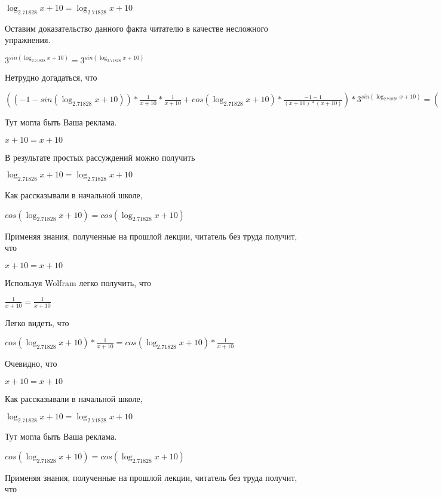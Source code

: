 \documentclass[12pt,a4paper,fleqn]{article}
\theoremstyle{definition}
\begin{document}
$\log_{ 2.71828 }{ x  +  10 } = \log_{ 2.71828 }{ x  +  10 }$

Оставим доказательство данного факта читателю в качестве несложного упражнения. 

${ 3 }^{sin(\log_{ 2.71828 }{ x  +  10 })} = { 3 }^{sin(\log_{ 2.71828 }{ x  +  10 })}$

Нетрудно догадаться, что 

$(( -1  - sin(\log_{ 2.71828 }{ x  +  10 })) * \frac{ 1 }{ x  +  10 }
 * \frac{ 1 }{ x  +  10 }
 + cos(\log_{ 2.71828 }{ x  +  10 }) * \frac{ -1  -  1 }{( x  +  10 ) * ( x  +  10 )}
) * { 3 }^{sin(\log_{ 2.71828 }{ x  +  10 })} = (( -1  - sin(\log_{ 2.71828 }{ x  +  10 })) * \frac{ 1 }{ x  +  10 }
 * \frac{ 1 }{ x  +  10 }
 + cos(\log_{ 2.71828 }{ x  +  10 }) * \frac{ -1  -  1 }{( x  +  10 ) * ( x  +  10 )}
) * { 3 }^{sin(\log_{ 2.71828 }{ x  +  10 })}$

Тут могла быть Ваша реклама. 

$ x  +  10  =  x  +  10 $

В результате простых рассуждений можно получить 

$\log_{ 2.71828 }{ x  +  10 } = \log_{ 2.71828 }{ x  +  10 }$

Как рассказывали в начальной школе, 

$cos(\log_{ 2.71828 }{ x  +  10 }) = cos(\log_{ 2.71828 }{ x  +  10 })$

Применяя знания, полученные на прошлой лекции, читатель без труда получит, что 

$ x  +  10  =  x  +  10 $

Используя Wolfram легко получить, что 

$\frac{ 1 }{ x  +  10 }
 = \frac{ 1 }{ x  +  10 }
$

Легко видеть, что 

$cos(\log_{ 2.71828 }{ x  +  10 }) * \frac{ 1 }{ x  +  10 }
 = cos(\log_{ 2.71828 }{ x  +  10 }) * \frac{ 1 }{ x  +  10 }
$

Очевидно, что 

$ x  +  10  =  x  +  10 $

Как рассказывали в начальной школе, 

$\log_{ 2.71828 }{ x  +  10 } = \log_{ 2.71828 }{ x  +  10 }$

Тут могла быть Ваша реклама. 

$cos(\log_{ 2.71828 }{ x  +  10 }) = cos(\log_{ 2.71828 }{ x  +  10 })$

Применяя знания, полученные на прошлой лекции, читатель без труда получит, что 
\end{document}
